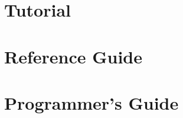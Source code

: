 \documentclass{book}
\begin{document}


{
\setlength{\parskip}{\dPar}
\setlength{\parindent}{0ex}


}

\tableofcontents
\listoffigures

\setlength{\parskip}{\dPar}
\setlength{\parindent}{0ex}

\part{Tutorial}



\part{Reference Guide}







\part{Programmer's Guide}


\end{document}
